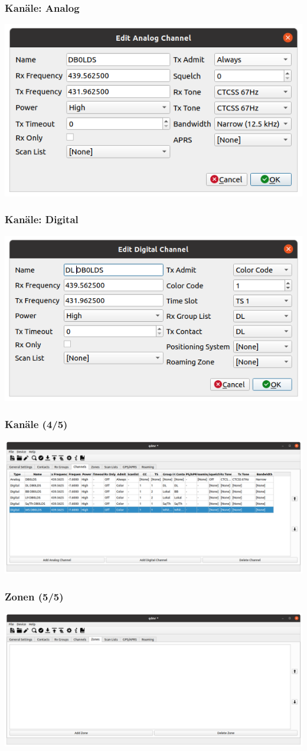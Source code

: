 \documentclass[aspectratio=169]{beamer}
\begin{document}
\begin{frame} \frametitle{Kanäle: Analog}
\begin{center}
 \includegraphics[width=0.5\linewidth]{../fig/qdmr-channels-edit-analog.png}
\end{center}
\end{frame}

\begin{frame} \frametitle{Kanäle: Digital}
\begin{center}
 \includegraphics[width=0.5\linewidth]{../fig/qdmr-channels-edit-digital.png}
\end{center}
\end{frame}

\begin{frame} \frametitle{Kanäle (4/5)}
\begin{center}
 \includegraphics[width=0.75\linewidth]{../fig/qdmr-channels-example.png}
\end{center}
\end{frame}

\begin{frame} \frametitle{Zonen (5/5)}
\begin{center}
 \includegraphics[width=0.75\linewidth]{../fig/qdmr-zone-empty.png}
\end{center}
\end{frame}
\end{document}
